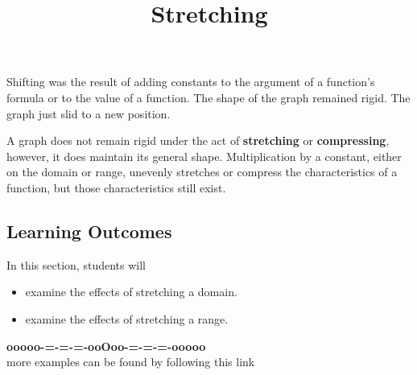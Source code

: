 \documentclass{ximera}
\title{Stretching}
\begin{document}
\begin{abstract}
\end{abstract}
\maketitle




Shifting was the result of adding constants to the argument of a function's formula or to the value of a function.  The shape of the graph remained rigid. The graph just slid to a new position. 



A graph does not remain rigid under the act of \textbf{stretching} or \textbf{compressing}, however, it does maintain its general shape. Multiplication by a constant, either on the domain or range, unevenly stretches or compress the characteristics of a function, but those characteristics still exist.



















\subsection*{Learning Outcomes}


\begin{sectionOutcomes}
In this section, students will 

\begin{itemize}
\item examine the effects of stretching a domain.
\item examine the effects of stretching a range.
\end{itemize}
\end{sectionOutcomes}









\begin{center}
\textbf{\textcolor{green!50!black}{ooooo-=-=-=-ooOoo-=-=-=-ooooo}} \\

more examples can be found by following this link\\ 

\end{center}
\end{document}
